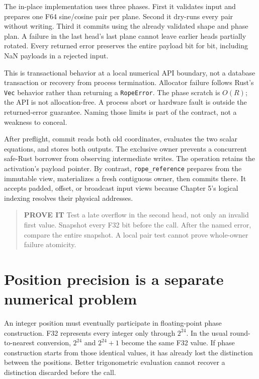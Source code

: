 The in-place implementation uses three phases. First it validates input
and prepares one F64 sine/cosine pair per plane. Second it dry-runs
every pair without writing. Third it commits using the already validated
shape and phase plan. A failure in the last head's last plane cannot
leave earlier heads partially rotated. Every returned error preserves
the entire payload bit for bit, including NaN payloads in a rejected
input.

This is transactional behavior at a local numerical API boundary, not a
database transaction or recovery from process termination. Allocator
failure follows Rust's \texttt{Vec} behavior rather than returning a
\texttt{RopeError}. The phase scratch is \(O(R)\); the API is not
allocation-free. A process abort or hardware fault is outside the
returned-error guarantee. Naming those limits is part of the contract,
not a weakness to conceal.

After preflight, commit reads both old coordinates, evaluates the two
scalar equations, and stores both outputs. The exclusive owner prevents
a concurrent safe-Rust borrower from observing intermediate writes. The
operation retains the activation's payload pointer. By contrast,
\texttt{rope\_reference} prepares from the immutable view, materializes
a fresh contiguous owner, then commits there. It accepts padded, offset,
or broadcast input views because Chapter 5's logical indexing resolves
their physical addresses.

\begin{quote}
\textbf{PROVE IT} Test a late overflow in the second head, not only an
invalid first value. Snapshot every F32 bit before the call. After the
named error, compare the entire snapshot. A local pair test cannot prove
whole-owner failure atomicity.
\end{quote}

\section{Position precision is a separate numerical
problem}\label{position-precision-is-a-separate-numerical-problem}

An integer position must eventually participate in floating-point phase
construction. F32 represents every integer only through \(2^{24}\). In
the usual round-to-nearest conversion, \(2^{24}\) and \(2^{24}+1\)
become the same F32 value. If phase construction starts from those
identical values, it has already lost the distinction between the
positions. Better trigonometric evaluation cannot recover a distinction
discarded before the call.

